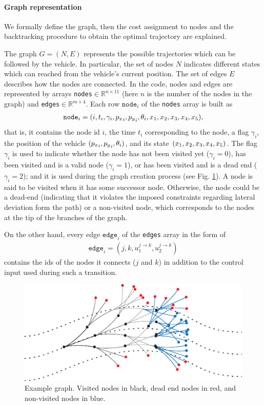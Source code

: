 	\paragraph{Graph representation}
		We formally define the graph, then the cost assignment to nodes and the backtracking procedure to obtain the optimal trajectory are explained.\par
		The graph $G = (N, E)$ represents the possible trajectories which can be followed by the vehicle. In particular, the set of nodes $N$ indicates different states which can reached from the vehicle's current position. The set of edges $E$ describes how the nodes are connected. 
		In the code, nodes and edges are represented by arrays \texttt{nodes}$\in\mathbb{R}^{n\times11}$ (here $n$ is the number of the nodes in the graph) and \texttt{edges}$\in\mathbb{R}^{m\times4}$.
		Each row $\texttt{node}_i$ of the \texttt{nodes} array is built as 
		\begin{align}
			\texttt{node}_i = (i, t_i, \gamma_i, {p_x}_i, {p_y}_i, {\theta}_i, x_1, x_2, x_3, x_4, x_5), 
		\end{align}
		that is, it contains the node id $i$, the time $t_i$ corresponding to the node, a flag $\gamma_i$, the position of the vehicle $({p_x}_i, {p_y}_i, {\theta}_i)$, and its state $(x_1, x_2, x_3, x_4, x_5)$.
		The flag $\gamma_i$ is used to indicate whether the node has not been visited yet ($\gamma_i = 0$), has been visited and is a valid node ($\gamma_i = 1$), or has been visited and is a dead end ($\gamma_i = 2$); and it is used during the graph creation process (see Fig. \ref{fig:Graph}).
		A node is said to be visited when it has some successor node. 
		Otherwise, the node could be a dead-end (indicating that it violates the imposed constraints regarding lateral deviation form the path) or a non-visited node, which corresponds to the nodes at the tip of the branches of the graph.\par 
		On the other hand, every edge $\texttt{edge}_i$ of the \texttt{edges} array in the form of 
		\begin{align}
			\texttt{edge}_i = (j, k, u_1^{j\to k}, u_2^{j\to k})
		\end{align}
		contains the ids of the nodes it connects ($j$ and $k$) in addition to the control input used during such a transition.
		\begin{figure}[!h]
			\centering
			\includegraphics[width = \linewidth]{./_imags/Graph}
			\caption{Example graph. Visited nodes in black, dead end nodes in red, and non-visited nodes in blue.}
			\label {fig:Graph}
		\end{figure}
